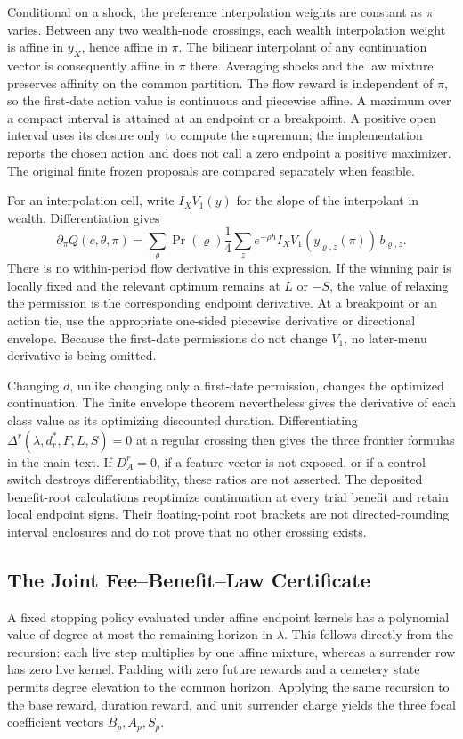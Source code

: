 Conditional on a shock, the preference interpolation weights are constant as $\pi$ varies. Between any two wealth-node crossings, each wealth interpolation weight is affine in $y_X$, hence affine in $\pi$. The bilinear interpolant of any continuation vector is consequently affine in $\pi$ there. Averaging shocks and the law mixture preserves affinity on the common partition. The flow reward is independent of $\pi$, so the first-date action value is continuous and piecewise affine. A maximum over a compact interval is attained at an endpoint or a breakpoint. A positive open interval uses its closure only to compute the supremum; the implementation reports the chosen action and does not call a zero endpoint a positive maximizer. The original finite frozen proposals are compared separately when feasible.

For an interpolation cell, write $I_XV_1(y)$ for the slope of the interpolant in wealth. Differentiation gives
\[
 \partial_\pi Q(c,\theta,\pi)
 =\sum_{\varrho}\Pr(\varrho)\frac14\sum_z
    e^{-\rho h} I_XV_1(y_{\varrho,z}(\pi))\,b_{\varrho,z}.
\]
There is no within-period flow derivative in this expression. If the winning pair is locally fixed and the relevant optimum remains at $L$ or $-S$, the value of relaxing the permission is the corresponding endpoint derivative. At a breakpoint or an action tie, use the appropriate one-sided piecewise derivative or directional envelope. Because the first-date permissions do not change $V_1$, no later-menu derivative is being omitted.

Changing $d$, unlike changing only a first-date permission, changes the optimized continuation. The finite envelope theorem nevertheless gives the derivative of each class value as its optimizing discounted duration. Differentiating $\Delta^r(\lambda,d_r^*,F,L,S)=0$ at a regular crossing then gives the three frontier formulas in the main text. If $D_A^r=0$, if a feature vector is not exposed, or if a control switch destroys differentiability, these ratios are not asserted. The deposited benefit-root calculations reoptimize continuation at every trial benefit and retain local endpoint signs. Their floating-point root brackets are not directed-rounding interval enclosures and do not prove that no other crossing exists.

\subsection{The Joint Fee--Benefit--Law Certificate}
A fixed stopping policy evaluated under affine endpoint kernels has a polynomial value of degree at most the remaining horizon in $\lambda$. This follows directly from the recursion: each live step multiplies by one affine mixture, whereas a surrender row has zero live kernel. Padding with zero future rewards and a cemetery state permits degree elevation to the common horizon. Applying the same recursion to the base reward, duration reward, and unit surrender charge yields the three focal coefficient vectors $B_p,A_p,S_p$.

